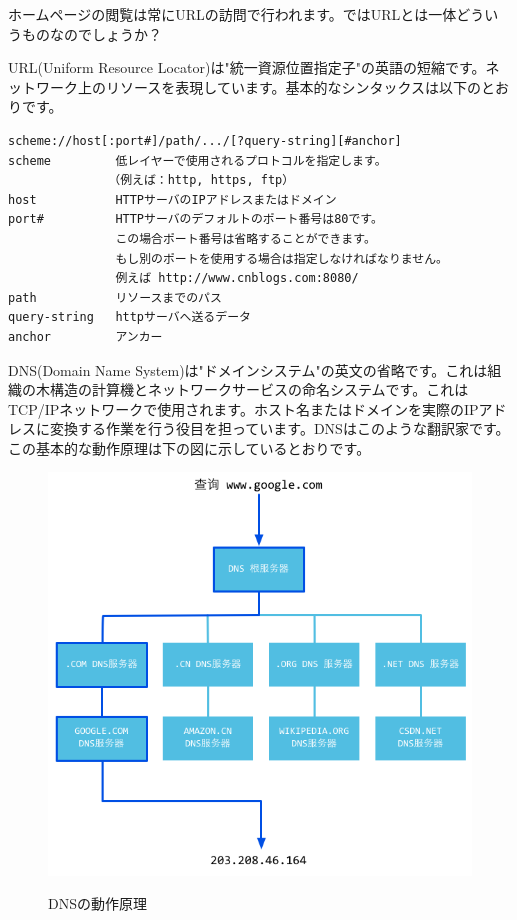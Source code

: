 ホームページの閲覧は常にURLの訪問で行われます。ではURLとは一体どういうものなのでしょうか？

URL(Uniform Resource Locator)は"統一資源位置指定子"の英語の短縮です。ネットワーク上のリソースを表現しています。基本的なシンタックスは以下のとおりです。

\begin{lstlisting}[numbers=none]
scheme://host[:port#]/path/.../[?query-string][#anchor]
scheme         低レイヤーで使用されるプロトコルを指定します。
              （例えば：http, https, ftp）
host           HTTPサーバのIPアドレスまたはドメイン
port#          HTTPサーバのデフォルトのポート番号は80です。
               この場合ポート番号は省略することができます。
               もし別のポートを使用する場合は指定しなければなりません。
               例えば http://www.cnblogs.com:8080/
path           リソースまでのパス
query-string   httpサーバへ送るデータ
anchor         アンカー
\end{lstlisting}


DNS(Domain Name System)は"ドメインシステム"の英文の省略です。これは組織の木構造の計算機とネットワークサービスの命名システムです。これはTCP/IPネットワークで使用されます。ホスト名またはドメインを実際のIPアドレスに変換する作業を行う役目を担っています。DNSはこのような翻訳家です。この基本的な動作原理は下の図に示しているとおりです。


\begin{figure}[H]
  \includegraphics[width=14cm]{3.1.dns_hierachy.png}
   \label{図3.2}
   \caption{DNSの動作原理}
\end{figure}


